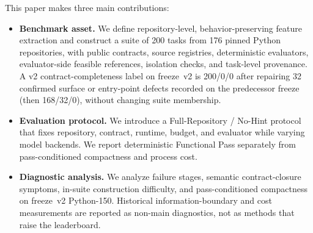 This paper makes three main contributions:
\begin{itemize}
  \item \textbf{Benchmark asset.} We define repository-level,
        behavior-preserving feature extraction and construct a suite of 200
        tasks from 176 pinned Python repositories, with public contracts,
        source registries, deterministic evaluators, evaluator-side feasible
        references, isolation checks, and task-level provenance. A v2
        contract-completeness label on freeze~v2 is 200/0/0 after repairing
        32 confirmed surface or entry-point defects recorded on the
        predecessor freeze (then 168/32/0), without changing suite membership.
  \item \textbf{Evaluation protocol.} We introduce a Full-Repository / No-Hint
        protocol that fixes repository, contract, runtime, budget, and evaluator
        while varying model backends. We report deterministic Functional Pass
        separately from pass-conditioned compactness and process cost.
  \item \textbf{Diagnostic analysis.} We analyze failure stages, semantic
        contract-closure symptoms, in-suite construction difficulty, and
        pass-conditioned compactness on freeze~v2 Python-150. Historical
        information-boundary and cost measurements are reported as
        non-main diagnostics, not as methods that raise the leaderboard.
\end{itemize}

